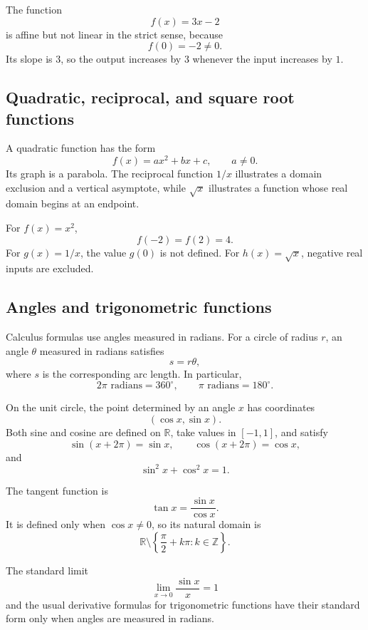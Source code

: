\begin{examplebox}
The function
\[
f(x)=3x-2
\]
is affine but not linear in the strict sense, because
\[
f(0)=-2\ne0.
\]
Its slope is \(3\), so the output increases by \(3\) whenever the input increases by \(1\).
\end{examplebox}

\subsection*{Quadratic, reciprocal, and square root functions}

A quadratic function has the form
\[
f(x)=ax^2+bx+c,
\qquad a\ne0.
\]
Its graph is a parabola. The reciprocal function \(1/x\) illustrates a domain exclusion and a vertical asymptote, while \(\sqrt{x}\) illustrates a function whose real domain begins at an endpoint.

\begin{examplebox}
For \(f(x)=x^2\),
\[
f(-2)=f(2)=4.
\]
For \(g(x)=1/x\), the value \(g(0)\) is not defined. For \(h(x)=\sqrt{x}\), negative real inputs are excluded.
\end{examplebox}

\subsection*{Angles and trigonometric functions}

Calculus formulas use angles measured in radians. For a circle of radius \(r\), an angle \(\theta\) measured in radians satisfies
\[
s=r\theta,
\]
where \(s\) is the corresponding arc length. In particular,
\[
2\pi\text{ radians}=360^\circ,
\qquad
\pi\text{ radians}=180^\circ.
\]

On the unit circle, the point determined by an angle \(x\) has coordinates
\[
(\cos x,\sin x).
\]
Both sine and cosine are defined on \(\mathbb{R}\), take values in \([-1,1]\), and satisfy
\[
\sin(x+2\pi)=\sin x,
\qquad
\cos(x+2\pi)=\cos x,
\]
and
\[
\sin^2x+\cos^2x=1.
\]

The tangent function is
\[
\tan x=\frac{\sin x}{\cos x}.
\]
It is defined only when \(\cos x\ne0\), so its natural domain is
\[
\mathbb{R}\setminus
\left\{
\frac{\pi}{2}+k\pi:k\in\mathbb{Z}
\right\}.
\]

\begin{remarkbox}
The standard limit
\[
\lim_{x\to0}\frac{\sin x}{x}=1
\]
and the usual derivative formulas for trigonometric functions have their standard form only when angles are measured in radians.
\end{remarkbox}

